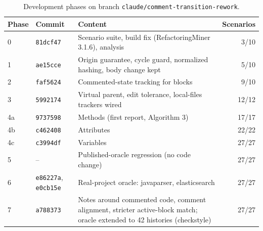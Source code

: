 \documentclass[11pt,a4paper]{article}
\newcommand{\code}[1]{\texttt{#1}}
\begin{document}
\begin{table}[h]
\centering\small
\caption{Development phases on branch \code{claude/comment-transition-rework}.}
\begin{tabular}{@{}llp{8.2cm}r@{}}
\toprule
Phase & Commit & Content & Scenarios \\
\midrule
0 & \code{81dcf47} & Scenario suite, build fix (RefactoringMiner 3.1.6), analysis & 3/10 \\
1 & \code{ae15cce} & Origin guarantee, cycle guard, normalized hashing, body change kept & 5/10 \\
2 & \code{faf5624} & Commented-state tracking for blocks & 9/10 \\
3 & \code{5992174} & Virtual parent, edit tolerance, local-files trackers wired & 12/12 \\
4a & \code{9737598} & Methods (first report, Algorithm 3) & 17/17 \\
4b & \code{c462408} & Attributes & 22/22 \\
4c & \code{c3994df} & Variables & 27/27 \\
5 & -- & Published-oracle regression (no code change) & 27/27 \\
6 & \code{e86227a}, \code{e0cb15e} & Real-project oracle: javaparser, elasticsearch & 27/27 \\
7 & \code{a788373} & Notes around commented code, comment alignment, stricter active-block match; oracle extended to 42 histories (checkstyle) & 27/27 \\
\bottomrule
\end{tabular}
\end{table}
\end{document}
